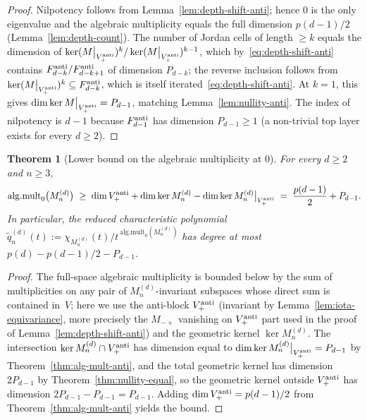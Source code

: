 \documentclass{amsart}
\newtheorem{theorem}{Theorem}[section]
\theoremstyle{definition}
\theoremstyle{remark}
\begin{document}
\begin{proof}
Nilpotency follows from Lemma~\ref{lem:depth-shift-anti}; hence
$0$ is the only eigenvalue and the algebraic multiplicity equals
the full dimension $p(d-1)/2$ (Lemma~\ref{lem:depth-count}).
The number of Jordan cells of length $\ge k$ equals the dimension
of $\ker(M\big|_{V_+^{\rm anti}})^k / \ker(M\big|_{V_+^{\rm anti}})^{k-1}$,
which by~\eqref{eq:depth-shift-anti} contains
$F_{d-k}^{\rm anti}/F_{d-k+1}^{\rm anti}$ of dimension $P_{d-k}$;
the reverse inclusion follows from
$\ker(M\big|_{V_+^{\rm anti}})^k \subseteq F_{d-k}^{\rm anti}$,
which is itself iterated~\eqref{eq:depth-shift-anti}.  At
$k = 1$, this gives $\dim \ker M\big|_{V_+^{\rm anti}} = P_{d-1}$,
matching Lemma~\ref{lem:nullity-anti}.  The index of
nilpotency is $d - 1$ because $F_{d-1}^{\rm anti}$ has dimension
$P_{d-1} \ge 1$ (a non-trivial top layer exists for every $d \ge 2$).
\end{proof}

\begin{theorem}[Lower bound on the algebraic multiplicity at $0$]
\label{thm:alg-mult-lower}
For every $d \ge 2$ and $n \ge 3$,
\begin{equation}\label{eq:alg-mult-lower}
  \mathrm{alg.mult}_0\bigl(M_n^{(d)}\bigr)
  \;\ge\; \dim V_+^{\rm anti} + \dim \ker M_n^{(d)}
        - \dim \ker M_n^{(d)}\big|_{V_+^{\rm anti}}
  \;=\; \frac{p(d-1)}{2} + P_{d-1}.
\end{equation}
In particular, the reduced characteristic polynomial
$\widetilde q_n^{(d)}(t) := \chi_{M_n^{(d)}}(t) /
t^{\,\mathrm{alg.mult}_0(M_n^{(d)})}$ has degree at most
$p(d) - p(d-1)/2 - P_{d-1}$.
\end{theorem}

\begin{proof}
The full-space algebraic multiplicity is bounded below by the
sum of multiplicities on any pair of
$M_n^{(d)}$-invariant subspaces whose direct sum is contained
in~$V$; here we use the anti-block $V_+^{\rm anti}$ (invariant
by Lemma~\ref{lem:iota-equivariance}, more precisely the
$M_{-+}$ vanishing on $V_+^{\rm anti}$ part used in the proof
of Lemma~\ref{lem:depth-shift-anti}) and the geometric kernel
$\ker M_n^{(d)}$.  The intersection
$\ker M_n^{(d)} \cap V_+^{\rm anti}$ has dimension equal to
$\dim \ker M_n^{(d)}\big|_{V_+^{\rm anti}} = P_{d-1}$
by Theorem~\ref{thm:alg-mult-anti}, and the total geometric
kernel has dimension $2 P_{d-1}$ by
Theorem~\ref{thm:nullity-equal}, so the geometric kernel
outside $V_+^{\rm anti}$ has dimension $2 P_{d-1} - P_{d-1}
= P_{d-1}$.  Adding $\dim V_+^{\rm anti} = p(d-1)/2$ from
Theorem~\ref{thm:alg-mult-anti} yields the bound.
\end{proof}
\end{document}
